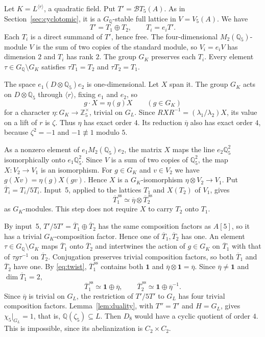 \documentclass[11pt]{article}
\newcommand{\Q}{\mathbb Q}
\newcommand{\Z}{\mathbb Z}
\begin{document}
Let \(K=L^{\langle r\rangle}\), a quadratic field. Put
\(T'=\mathcal BT_5(A)\). As in Section~\ref{sec:cyclotomic}, it is a
\(G_{\Q}\)-stable full lattice in \(V=V_5(A)\). We have
\[
 T'=T_1\oplus T_2,\qquad T_i=e_iT'.
\]
Each \(T_i\) is a direct summand of \(T'\), hence free. The
four-dimensional \(M_2(\Q_5)\)-module \(V\) is the sum of two copies of
the standard module, so \(V_i=e_iV\) has dimension \(2\) and \(T_i\)
has rank \(2\). The group \(G_K\) preserves each \(T_i\). Every element
\(\tau\in G_{\Q}\setminus G_K\) satisfies \(\tau T_1=T_2\) and
\(\tau T_2=T_1\).

The space \(e_1(D\otimes\Q_5)e_2\) is one-dimensional. Let \(X\) span
it. The group \(G_K\) acts on \(D\otimes\Q_5\) through
\(\langle r\rangle\), fixing \(e_1\) and \(e_2\), so
\[
 g\cdot X=\eta(g)X\qquad(g\in G_K)
\]
for a character \(\eta:G_K\to\Z_5^\times\), trivial on \(G_L\). Since
\(RXR^{-1}=(\lambda_1/\lambda_2)X\), its value on a lift of \(r\) is
\(\zeta\). Thus \(\eta\) has exact order \(4\). Its reduction
\(\overline\eta\) also has exact order \(4\), because \(\zeta^2=-1\)
and \(-1\not\equiv1\) modulo \(5\).

As a nonzero element of \(e_1M_2(\Q_5)e_2\), the matrix \(X\) maps the
line \(e_2\Q_5^2\) isomorphically onto \(e_1\Q_5^2\). Since \(V\) is a
sum of two copies of \(\Q_5^2\), the map \(X:V_2\to V_1\) is an
isomorphism. For \(g\in G_K\) and \(v\in V_2\) we have
\(g(Xv)=\eta(g)X(gv)\). Hence \(X\) is a \(G_K\)-isomorphism
\(\eta\otimes V_2\to V_1\). Put \(\overline T_i=T_i/5T_i\). Input~5,
applied to the lattices \(T_1\) and \(X(T_2)\) of \(V_1\), gives
\begin{equation}\label{eq:twist}
 \overline T_1^{\,\mathrm{ss}}\simeq
 \overline\eta\otimes\overline T_2^{\,\mathrm{ss}}
\end{equation}
as \(G_K\)-modules. This step does not require \(X\) to carry \(T_2\)
onto \(T_1\).

By input~5, \(T'/5T'=\overline T_1\oplus\overline T_2\) has the same
composition factors as \(A[5]\), so it has a trivial
\(G_K\)-composition factor. Hence one of \(\overline T_1,\overline
T_2\) has one. An element \(\tau\in G_{\Q}\setminus G_K\) maps
\(\overline T_1\) onto \(\overline T_2\) and intertwines the action of
\(g\in G_K\) on \(\overline T_1\) with that of \(\tau g\tau^{-1}\) on
\(\overline T_2\). Conjugation preserves trivial composition factors,
so both \(\overline T_1\) and \(\overline T_2\) have one. By
\eqref{eq:twist}, \(\overline T_1^{\,\mathrm{ss}}\) contains both
\(\mathbf 1\) and \(\overline\eta\otimes\mathbf 1=\overline\eta\).
Since \(\overline\eta\neq\mathbf 1\) and \(\dim\overline T_1=2\),
\[
 \overline T_1^{\,\mathrm{ss}}\simeq\mathbf 1\oplus\overline\eta,
 \qquad
 \overline T_2^{\,\mathrm{ss}}\simeq\mathbf 1\oplus\overline\eta^{-1}.
\]
Since \(\overline\eta\) is trivial on \(G_L\), the restriction of
\(T'/5T'\) to \(G_L\) has four trivial composition factors.
Lemma~\ref{lem:duality}, with \(T''=T'\) and \(H=G_L\), gives
\(\chi_5|_{G_L}=1\), that is, \(\Q(\zeta_5)\subseteq L\). Then \(D_8\)
would have a cyclic quotient of order \(4\). This is impossible, since
its abelianization is \(C_2\times C_2\).
\end{document}
